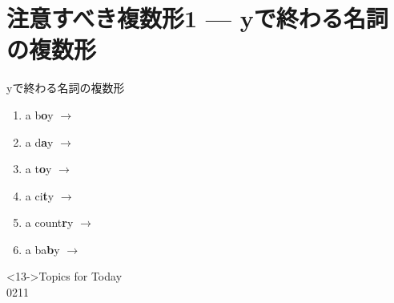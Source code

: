 \documentclass[aspectratio=169,xcolor={dvipsnames,table}]{beamer}
\newcommand{\myaudio}[1]{\href{#1}{\faVolumeUp}}
\begin{document}
\section{注意すべき複数形1 --- yで終わる名詞の複数形}
\begin{frame}[plain]{yで終わる名詞の複数形}\Large
\begin{enumerate}
 \item<1-> a b\textbf<14->{\textcolor<14->{YellowOrange}{o}}y $\rightarrow$ 
 \item<3-> a d\textbf<14->{\textcolor<14->{YellowOrange}{a}}y $\rightarrow$ 
 \item<5-> a t\textbf<14->{\textcolor<14->{YellowOrange}{o}}y $\rightarrow$ 
 \item<7-> a ci\textbf<14->{\textcolor<14->{CarnationPink}{t}}y $\rightarrow$ 
 \item<9-> a count\textbf<14->{\textcolor<14->{CarnationPink}{r}}y $\rightarrow$ 
 \item<11-> a ba\textbf<14->{\textcolor<14->{CarnationPink}{b}}y $\rightarrow$ 
\end{enumerate} 

\normalsize
\begin{block}<13->{Topics for Today}
\\
{\tiny 0211}\,{\scriptsize \myaudio{./audio/005_singular_plural_b.mp3}}\hfill{}
\end{block}

\end{frame}
\end{document}
